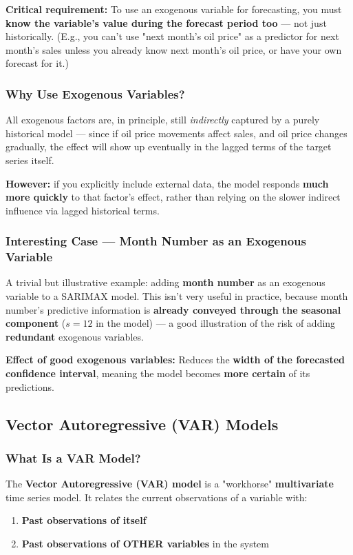 \documentclass[12pt,openany]{book}
\begin{document}
\textbf{Critical requirement:} To use an exogenous variable for forecasting, you must \textbf{know the variable's value during the forecast period too} --- not just historically. (E.g., you can't use "next month's oil price" as a predictor for next month's sales unless you already know next month's oil price, or have your own forecast for it.)

\subsubsection{Why Use Exogenous Variables?}

All exogenous factors are, in principle, still \textit{indirectly} captured by a purely historical model --- since if oil price movements affect sales, and oil price changes gradually, the effect will show up eventually in the lagged terms of the target series itself.

\textbf{However:} if you explicitly include external data, the model responds \textbf{much more quickly} to that factor's effect, rather than relying on the slower indirect influence via lagged historical terms.

\subsubsection{Interesting Case --- Month Number as an Exogenous Variable}

A trivial but illustrative example: adding \textbf{month number} as an exogenous variable to a SARIMAX model. This isn't very useful in practice, because month number's predictive information is \textbf{already conveyed through the seasonal component} (\(s=12\) in the model) --- a good illustration of the risk of adding \textbf{redundant} exogenous variables.

\textbf{Effect of good exogenous variables:} Reduces the \textbf{width of the forecasted confidence interval}, meaning the model becomes \textbf{more certain} of its predictions.

\subsection{Vector Autoregressive (VAR) Models}

\subsubsection{What Is a VAR Model?}

The \textbf{Vector Autoregressive (VAR) model} is a "workhorse" \textbf{multivariate} time series model. It relates the current observations of a variable with:
\begin{enumerate}[leftmargin=*]
    \item \textbf{Past observations of itself}
    \item \textbf{Past observations of OTHER variables} in the system
\end{enumerate}
\end{document}

